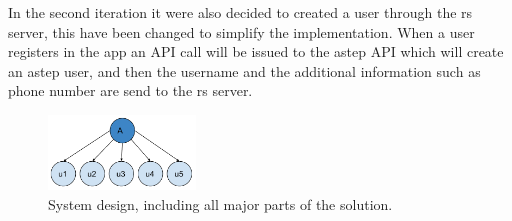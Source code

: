 In the second iteration it were also decided to created a user through the \gls{rs} server, this have been changed to simplify the implementation.
When a user registers in the app an API call will be issued to the \gls{astep} API which will create an \gls{astep} user, and then the username and the additional information such as phone number are send to the \gls{rs} server.



\begin{figure}[!h]
	\centering
	\includegraphics[width=0.35\textwidth]{figures/userafter.pdf}
	\caption{System design, including all major parts of the solution.}
	\label{fig:userafter}
\end{figure}

